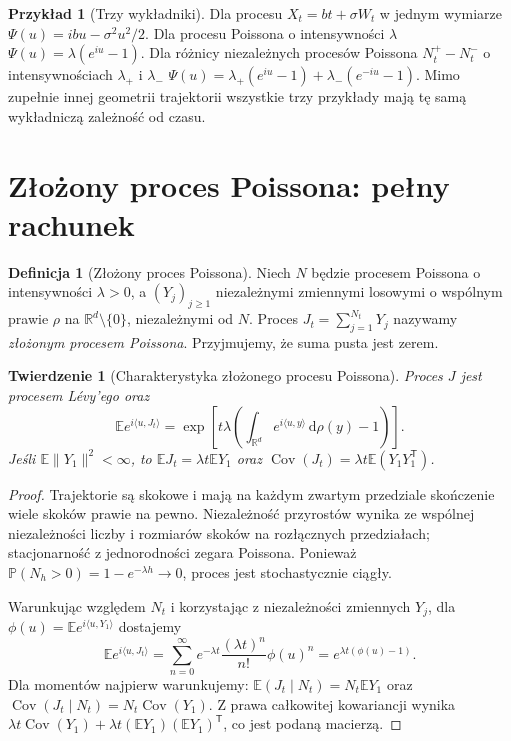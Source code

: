 \documentclass[11pt,a4paper,oneside]{report}
\numberwithin{equation}{chapter}
\theoremstyle{plain}
\newtheorem{twierdzenie}{Twierdzenie}[chapter]
\theoremstyle{definition}
\newtheorem{definicja}{Definicja}[chapter]
\newtheorem{przyklad}{Przykład}[chapter]
\theoremstyle{remark}
\newcommand{\R}{\mathbb{R}}
\newcommand{\Prob}{\mathbb{P}}
\newcommand{\E}{\mathbb{E}}
\newcommand{\dd}{\mathrm{d}}
\begin{document}
\begin{przyklad}[Trzy wykładniki]
Dla procesu $X_t=bt+\sigma W_t$ w jednym wymiarze
$\Psi(u)=ibu-\sigma^2u^2/2$.
Dla procesu Poissona o intensywności $\lambda$
$\Psi(u)=\lambda(e^{iu}-1)$.
Dla różnicy niezależnych procesów Poissona
$N_t^+-N_t^-$ o intensywnościach $\lambda_+$ i $\lambda_-$
$\Psi(u)=\lambda_+(e^{iu}-1)+\lambda_-(e^{-iu}-1)$.
Mimo zupełnie innej geometrii trajektorii wszystkie trzy
przykłady mają tę samą wykładniczą zależność od czasu.
\end{przyklad}

\section{Złożony proces Poissona: pełny rachunek}\label{sec:volIII:10:03}

\begin{definicja}[Złożony proces Poissona]\label{def:volIII:10:02}
Niech $N$ będzie procesem Poissona o intensywności
$\lambda>0$, a $(Y_j)_{j\ge1}$ niezależnymi zmiennymi
losowymi o wspólnym prawie $\rho$ na $\R^d\setminus\{0\}$,
niezależnymi od $N$. Proces
$J_t=\sum_{j=1}^{N_t}Y_j$ nazywamy \emph{złożonym
procesem Poissona}. Przyjmujemy, że suma pusta jest zerem.
\end{definicja}

\begin{twierdzenie}[Charakterystyka złożonego procesu Poissona]\label{thm:volIII:10:02}
\label{th:cpp}
Proces $J$ jest procesem Lévy'ego oraz
\[
\E e^{i\langle u,J_t\rangle}
=\exp\left[t\lambda\left(\int_{\R^d} e^{i\langle u,y\rangle}
\,\dd\rho(y)-1\right)\right].
\]
Jeśli $\E\|Y_1\|^2<\infty$, to
$\E J_t=\lambda t\E Y_1$ oraz
$\operatorname{Cov}(J_t)=\lambda t\E(Y_1Y_1^{\mathsf T})$.
\end{twierdzenie}
\begin{proof}
Trajektorie są skokowe i mają na każdym zwartym przedziale
skończenie wiele skoków prawie na pewno.
Niezależność przyrostów wynika ze wspólnej niezależności
liczby i rozmiarów skoków na rozłącznych przedziałach;
stacjonarność z jednorodności zegara Poissona.
Ponieważ $\Prob(N_h>0)=1-e^{-\lambda h}\to0$,
proces jest stochastycznie ciągły.

Warunkując względem $N_t$ i korzystając z niezależności
zmiennych $Y_j$, dla
$\phi(u)=\E e^{i\langle u,Y_1\rangle}$ dostajemy
\[
\E e^{i\langle u,J_t\rangle}
=\sum_{n=0}^\infty e^{-\lambda t}
\frac{(\lambda t)^n}{n!}\phi(u)^n
=e^{\lambda t(\phi(u)-1)}.
\]
Dla momentów najpierw warunkujemy:
$\E(J_t\mid N_t)=N_t\E Y_1$ oraz
$\operatorname{Cov}(J_t\mid N_t)=N_t\operatorname{Cov}(Y_1)$.
Z prawa całkowitej kowariancji wynika
$\lambda t\operatorname{Cov}(Y_1)+
\lambda t(\E Y_1)(\E Y_1)^{\mathsf T}$,
co jest podaną macierzą.
\end{proof}
\end{document}
